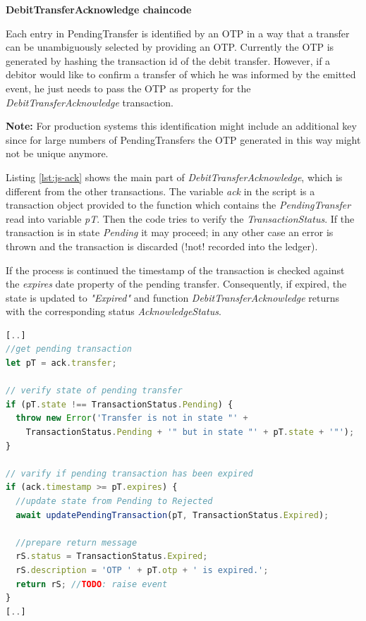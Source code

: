 \textbf{DebitTransferAcknowledge chaincode}

Each entry in PendingTransfer is identified by an OTP in a way that a transfer can be unambiguously selected by providing an OTP. Currently the OTP is generated by hashing the transaction id of the debit transfer. However, if a debitor would like to confirm a transfer of which he was informed by the emitted event, he just needs to pass the OTP as property for the \textit{DebitTransferAcknowledge} transaction.

\textbf{Note:} For production systems this identification might include an additional key since for large numbers of PendingTransfers the OTP generated in this way might not be unique anymore.

Listing \ref{lst:js-ack} shows the main part of \textit{DebitTransferAcknowledge}, which is different from the other transactions. The variable \textit{ack} in the script is a transaction object provided to the function which contains the \textit{PendingTransfer} read into variable \textit{pT}. Then the code tries to verify the \textit{TransactionStatus}. If the transaction is in state \textit{Pending} it may proceed; in any other case an error is thrown and the transaction is discarded (!not! recorded into the ledger).

If the process is continued the timestamp of the transaction is checked against the \textit{expires} date property of the pending transfer. Consequently, if expired, the state is updated to \textit{"Expired"} and function \textit{DebitTransferAcknowledge} returns with the corresponding status \textit{AcknowledgeStatus}.

\begin{center}
\begin{minipage}{0.8\textwidth}
\small
\begin{lstlisting}[language=javascript,firstnumber=1,caption={\bf\small RequestDebitAcknowledge JavaScript excerpt}, captionpos=b,label=lst:js-ack]
[..]
//get pending transaction
let pT = ack.transfer;

// verify state of pending transfer
if (pT.state !== TransactionStatus.Pending) {
  throw new Error('Transfer is not in state "' +
    TransactionStatus.Pending + '" but in state "' + pT.state + '"');
}

// varify if pending transaction has been expired
if (ack.timestamp >= pT.expires) {
  //update state from Pending to Rejected
  await updatePendingTransaction(pT, TransactionStatus.Expired);

  //prepare return message
  rS.status = TransactionStatus.Expired;
  rS.description = 'OTP ' + pT.otp + ' is expired.';
  return rS; //TODO: raise event
}
[..]
\end{lstlisting}
\end{minipage}
\end{center}

